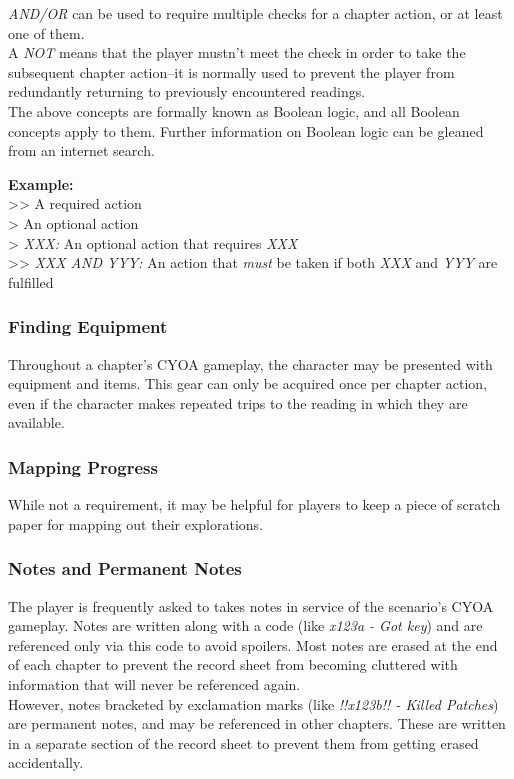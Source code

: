 \documentclass[12pt]{article}
\begin{document}
\begin{multicols*}{2}
\emph{AND/OR} can be used to require multiple checks for a chapter action, or at least one of them.\\

A \emph{NOT} means that the player mustn’t meet the check in order to take the subsequent chapter action--it is normally used to prevent the player from redundantly returning to previously encountered readings.\\

The above concepts are formally known as Boolean logic, and all Boolean concepts apply to them. Further information on Boolean logic can be gleaned from an internet search.

\begin{tcolorbox}
\textbf{Example:}\\
>> A required action \\
> An optional action \\
> \emph{XXX:} An optional action that requires \emph{XXX}\\
>> \emph{XXX AND YYY:} An action that \emph{must} be taken if both \emph{XXX} and \emph{YYY} are fulfilled
\end{tcolorbox}

\subsubsection{Finding Equipment}
Throughout a chapter’s CYOA gameplay, the character may be presented with equipment and items. This gear can only be acquired once per chapter action, even if the character makes repeated trips to the reading in which they are available. 

\subsubsection{Mapping Progress}
While not a requirement, it may be helpful for players to keep a piece of scratch paper for mapping out their explorations.

\subsubsection{Notes and Permanent Notes}
The player is frequently asked to takes notes in service of the scenario’s CYOA gameplay. Notes are written along with a code (like \emph{x123a - Got key}) and are referenced only via this code to avoid spoilers. Most notes are erased at the end of each chapter to prevent the record sheet from becoming cluttered with information that will never be referenced again.\\
However, notes bracketed by exclamation marks (like \emph{!!x123b!! - Killed Patches}) are permanent notes, and may be referenced in other chapters. These are written in a separate section of the record sheet to prevent them from getting erased accidentally.


\end{multicols*}
\end{document}
